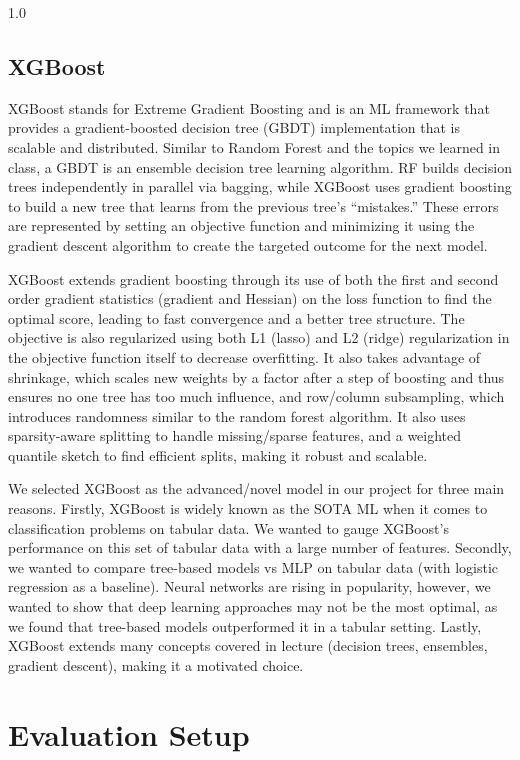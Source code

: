\begin{spacing}{1.0}
\subsection{XGBoost}

XGBoost \cite{xgboost_paper} stands for Extreme Gradient Boosting and is an ML framework that provides a gradient-boosted decision tree (GBDT) implementation that is scalable and distributed. Similar to Random Forest and the topics we learned in class, a GBDT is an ensemble decision tree learning algorithm. RF builds decision trees independently in parallel via bagging, while XGBoost uses gradient boosting to build a new tree that learns from the previous tree's ``mistakes.'' These errors are represented by setting an objective function and minimizing it using the gradient descent algorithm to create the targeted outcome for the next model.

XGBoost extends gradient boosting through its use of both the first and second order gradient statistics (gradient and Hessian) on the loss function to find the optimal score, leading to fast convergence and a better tree structure. The objective is also regularized using both L1 (lasso) and L2 (ridge) regularization in the objective function itself to decrease overfitting. It also takes advantage of shrinkage, which scales new weights by a factor after a step of boosting and thus ensures no one tree has too much influence, and row/column subsampling, which introduces randomness similar to the random forest algorithm. It also uses sparsity-aware splitting to handle missing/sparse features, and a weighted quantile sketch to find efficient splits, making it robust and scalable.

We selected XGBoost as the advanced/novel model in our project for three main reasons. Firstly, XGBoost is widely known as the SOTA ML when it comes to classification problems on tabular data. We wanted to gauge XGBoost's performance on this set of tabular data with a large number of features. Secondly, we wanted to compare tree-based models vs MLP on tabular data (with logistic regression as a baseline). Neural networks are rising in popularity, however, we wanted to show that deep learning approaches may not be the most optimal, as we found that tree-based models outperformed it in a tabular setting.  Lastly, XGBoost extends many concepts covered in lecture (decision trees, ensembles, gradient descent), making it a motivated choice.

\section{Evaluation Setup}


\end{spacing}
